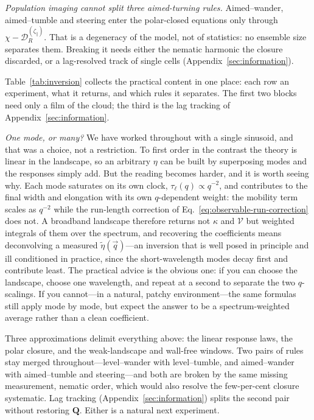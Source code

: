 \documentclass[
  reprint,
  superscriptaddress,
  amsmath,
  amssymb,
  aps,
  pre,
  nofootinbib,
  floatfix
]{revtex4-2}
\newcommand{\Qt}{\mathbf Q}
\newcommand{\zp}{\zeta_\parallel}
\begin{document}
\emph{Population imaging cannot split three aimed-turning rules.}
Aimed--wander, aimed--tumble and steering enter the polar-closed equations
only through $\chi-\mathcal D_R^{(\zp)}$.  That is a degeneracy of the model,
not of statistics: no ensemble size separates them.  Breaking it needs either
the nematic harmonic the closure discarded, or a lag-resolved track of single
cells (Appendix~\ref{sec:information}).

Table~\ref{tab:inversion} collects the practical content in one place: each
row an experiment, what it returns, and which rules it separates.  The first
two blocks need only a film of the cloud; the third is the lag tracking of
Appendix~\ref{sec:information}.

\emph{One mode, or many?}  We have worked throughout with a single sinusoid,
and that was a choice, not a restriction.  To first order in the contrast the
theory is linear in the landscape, so an arbitrary $\eta$ can be built by
superposing modes and the responses simply add.  But the reading becomes
harder, and it is worth seeing why.  Each mode saturates on its own clock,
$\tau_\ell(q)\propto q^{-2}$, and contributes to the final width and
elongation with its own $q$-dependent weight: the mobility term scales as
$q^{-2}$ while the run-length correction of
Eq.~\eqref{eq:observable-run-correction} does not.  A broadband landscape
therefore returns not $\kappa$ and $\mathcal V$ but weighted integrals of
them over the spectrum, and recovering the coefficients means deconvolving a
measured $\tilde\eta(\vec q)$---an inversion that is well posed in principle
and ill conditioned in practice, since the short-wavelength modes decay first
and contribute least.  The practical advice is the obvious one: if you can
choose the landscape, choose one wavelength, and repeat at a second to
separate the two $q$-scalings.  If you cannot---in a natural, patchy
environment---the same formulas still apply mode by mode, but expect the
answer to be a spectrum-weighted average rather than a clean coefficient.

Three approximations delimit everything above: the linear response laws, the
polar closure, and the weak-landscape and wall-free windows.  Two pairs of
rules stay merged throughout---level--wander with level--tumble, and
aimed--wander with aimed--tumble and steering---and both are broken by the
same missing measurement, nematic order, which would also resolve the
few-per-cent closure systematic.  Lag tracking
(Appendix~\ref{sec:information}) splits the second pair without restoring
$\Qt$.  Either is a natural next experiment.
\end{document}
